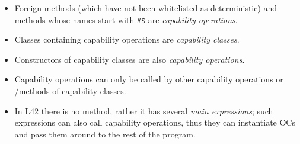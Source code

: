 \begin{itemize}
\item Foreign methods (which have not been whitelisted as deterministic) and methods whose names start with \texttt{\#\$} are \emph{capability operations}.
\item Classes containing capability operations are \emph{capability classes}.
\item Constructors of capability classes are also \emph{capability operations}.
\item Capability operations can only be called by other capability operations or \Q@mut@/\Q@capsule@ methods of capability classes.
\item In L42 there is no \Q@main@ method, rather it has several \emph{main expressions}; such expressions can also call capability operations, thus they can instantiate OCs and pass them around to the rest of the program.

\end{itemize}



